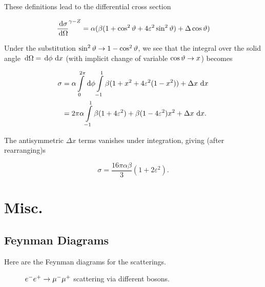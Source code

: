 \documentclass[]{report}
\begin{document}
These definitions lead to the differential cross section

$$
\frac{\,\operatorname{d}\!{\sigma}}{\,\operatorname{d}\!{\Omega}}^{\gamma-Z }
  = \alpha(\beta(1+\cos^{2}{\vartheta}+4\varepsilon^{2}\sin^{2}{\vartheta})
    + \Delta\cos{\vartheta}
  )
$$

Under the substitution $\sin^{2}{\vartheta} \rightarrow 1-\cos^{2}{\vartheta}$, we see that the integral over the solid angle $\,\operatorname{d}\!{\Omega} = \,\operatorname{d}\!{\phi}\,\operatorname{d}\!{x}$ (with implicit change of variable $\cos{\vartheta}\rightarrow x$) becomes

\begin{align*}
\sigma &= \alpha \int\limits_{0}^{2\pi}\d{\phi}
	\int\limits_{-1}^{1}
		\beta(1+x^{2}+4\varepsilon^{2}(1- x^{2}))
    	+ \Delta x
	\d{x}
\\
&= 2\pi\alpha \int\limits_{-1}^{1} \beta(1+4\varepsilon^{2})+\beta(1-4\varepsilon^{2})x^{2} + \Delta x \d{x}.
\end{align*}

The antisymmetric $\Delta x$ terms vanishes under integration, giving (after rearranging)s

$$
\sigma = \frac{16\pi\alpha\beta}{3}(1 + 2\varepsilon^{2}).
$$

\chapter{Misc.}

\section{Feynman Diagrams}

Here are the Feynman diagrams for the scatterings.

\begin{figure}[h]
	\vspace{10pt}
	\centering
	\qquad
	\caption{$e^{-}e^{+}\rarrow\mu^{-}\mu^{+}$ scattering via different bosons.}
\end{figure}
\end{document}
